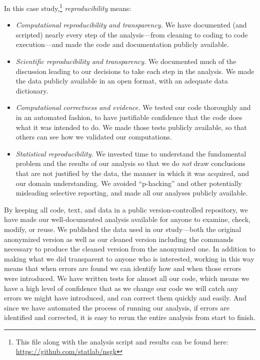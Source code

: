 \documentclass[]{article}
\begin{document}
In this case study,\footnote{
This file along with the analysis script and results
can be found here: \url{https://github.com/statlab/nsgk}
}
\emph{reproducibility} means:
\begin{itemize}
   \item \emph{Computational reproducibility and transparency.}
             We have documented (and scripted) nearly
            every step of the analysis---from cleaning to coding to code execution---and
            made the code and documentation publicly available.
   \item \emph{Scientific reproducibility and transparency.} We documented much of the discussion 
             leading to our decisions to take each step in the analysis.
             We made the data publicly available in an open format, with an adequate data
             dictionary.
   \item \emph{Computational correctness and evidence.}
            We tested our code thoroughly and in an automated fashion, 
            to have justifiable confidence that the code does what it was intended
             to do. We made those tests publicly available, so that others can see how
             we validated our computations.
    \item \emph{Statistical reproducibility.} We invested time to understand the fundamental
             problem and the results of our analysis so that we do \emph{not} draw
             conclusions that are not justified by the data, the manner in which it was
             acquired, and our domain understanding.
             We avoided ``p-hacking'' and other potentially misleading selective reporting,
             and made all our analyses publicly available.
\end{itemize}

By keeping all code, text, and data in a public version-controlled repository, 
we have made our well-documented analysis available
for anyone to examine, check, modify, or reuse.
We published the data used in our study---both the original anonymized
version as well as our cleaned version including the commands necessary
to produce the cleaned version from the anonymized one.
In addition to making what we did transparent to anyone who is interested,
working in this way means that when errors are found we can identify
how and when those errors were introduced.
We have written tests for almost all our code, which means we have a high
level of confidence that as we change our code we will catch any errors
we might have introduced, and can correct them quickly and easily.
And since we have automated the process of running our analysis, if errors
are identified and corrected, it is easy to rerun the entire analysis from
start to finish.
\end{document}
